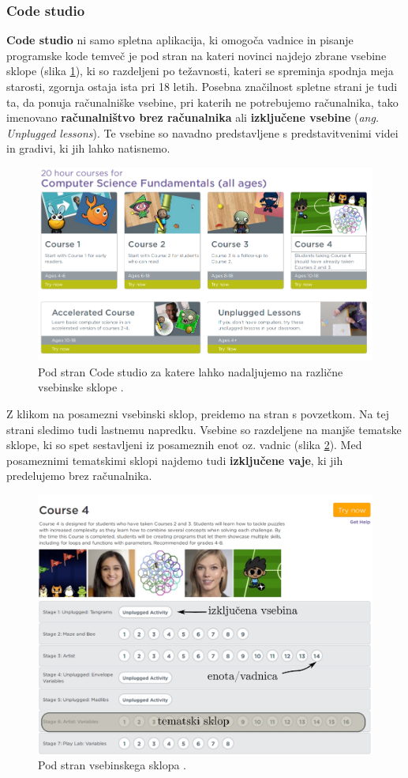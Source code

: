 \subsubsection{Code studio}
\label{sec:code-studio}

\textbf{Code studio} ni samo spletna aplikacija, ki omogoča vadnice in
pisanje programske kode temveč je pod stran na kateri novinci najdejo
zbrane vsebine sklope (slika \ref{fig:scr:web:codestudio:main}), ki so
razdeljeni po težavnosti, kateri se spreminja spodnja meja starosti,
zgornja ostaja ista pri 18 letih. Posebna značilnost spletne strani je
tudi ta, da ponuja računalniške vsebine, pri katerih ne potrebujemo
računalnika, tako imenovano \textbf{računalništvo brez računalnika}
ali \textbf{izključene vsebine} (\emph{ang. Unplugged lessons}). Te
vsebine so navadno predstavljene s predstavitvenimi videi in gradivi,
ki jih lahko natisnemo. 

\begin{figure}[h!]
  \centering
    \includegraphics [width=0.65\linewidth, keepaspectratio =
    1] {./images/sc_web/code_cs_main_v01.png}
    \caption{Pod stran Code studio za katere lahko nadaljujemo na
      različne vsebinske sklope \cite{web:code.org:studio}.}
    \label{fig:scr:web:codestudio:main}
  \end{figure}

  Z klikom na posamezni vsebinski sklop, preidemo na stran s
  povzetkom. Na tej strani sledimo tudi lastnemu napredku. Vsebine so
  razdeljene na manjše tematske sklope, ki so spet sestavljeni iz
  posameznih enot oz. vadnic (slika
  \ref{fig:scr:web:codestudio:course}). Med posameznimi tematskimi
  sklopi najdemo tudi \textbf{izključene vaje}, ki jih predelujemo
  brez računalnika.

\begin{figure}[h!]
  \centering
    \includegraphics [width=0.65\linewidth, keepaspectratio =
    1] {./images/sc_web/code_course.png}
    \caption{Pod stran vsebinskega sklopa \cite{web:code.org:studio}.}
    \label{fig:scr:web:codestudio:course}
  \end{figure}
  
